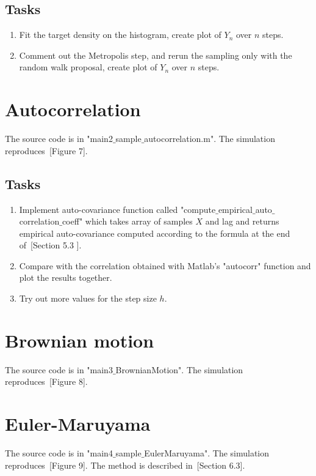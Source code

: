 \documentclass{scrartcl}
\begin{document}
\subsection{Tasks}
\begin{enumerate}
\item Fit the target density on the histogram, create plot of $Y_n$ over $n $ steps.
\item Comment out the Metropolis step, and rerun the sampling only with the random walk proposal, create plot of $Y_n$ over $n $ steps.
\end{enumerate}


\section{Autocorrelation}

The source code is in "main2$\_$sample$\_$autocorrelation.m". The simulation reproduces~\cite{sanz2014markov}[Figure 7].

\subsection{Tasks}
\begin{enumerate}
\item Implement auto-covariance function called "compute$\_$empirical$\_$auto$\_$correlation$\_$coeff" which takes array of samples $X$ and lag and returns empirical auto-covariance computed according to the formula at the end of~\cite{sanz2014markov}[Section 5.3 ].
\item Compare with the correlation obtained with Matlab's "autocorr" function and plot the results together.
\item Try out more values for the step size $h$.
\end{enumerate}


\section{Brownian motion}

The source code is in "main3$\_$BrownianMotion". The simulation reproduces~\cite{sanz2014markov}[Figure 8].



\section{Euler-Maruyama}

The source code is in "main4$\_$sample$\_$EulerMaruyama". The simulation reproduces~\cite{sanz2014markov}[Figure 9]. The method is described in~\cite{sanz2014markov}[Section 6.3].
\end{document}
